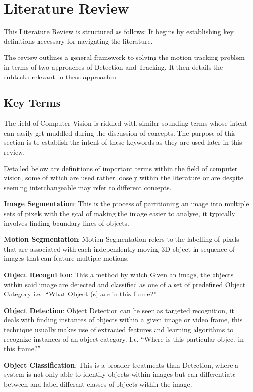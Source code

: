 \chapter{Literature Review}\label{chapter_literature_review}
This Literature Review is structured as follows: It begins by establishing key
definitions necessary for navigating the literature.

The review outlines a general framework to solving the motion tracking
problem in terms of two approaches of Detection and Tracking. It then details
the subtasks relevant to these approaches.

\section{Key Terms}
The field of Computer Vision is riddled with similar sounding terms whose intent
can easily get muddled during the discussion of concepts. The purpose of this section
is to establish the intent of these keywords as they are used later in this
review.

Detailed below are definitions of important terms within the field of computer
vision, some of which are used rather loosely within the literature or are
despite seeming interchangeable may refer to different concepts. 

\textbf{Image Segmentation}: This is the process of partitioning an image into multiple
sets of pixels with the goal of making the image easier to analyse, it typically
involves finding boundary lines of objects. 

\textbf{Motion Segmentation}: Motion Segmentation refers to the labelling of pixels that
are associated with each independently moving 3D object in sequence of images
that can feature multiple motions.~\cite{Tekalp2014}

\textbf{Object Recognition}: This a method by which Given an image, the objects within
said image are detected and classified as one of a set of predefined Object
Category i.e.\ ``What Object (s) are in this frame?''

\textbf{Object Detection}: Object Detection can be seen as targeted recognition, it deals
with finding instances of objects within a given image or video frame, this
technique usually makes use of extracted features and learning algorithms to
recognize instances of an object category.  I.e. “Where is this particular
object in this frame?”

\textbf{Object Classification}: This is a broader treatments than Detection, where a
system is not only able to identify objects within images but can differentiate
between and label different classes of objects within the image. 

